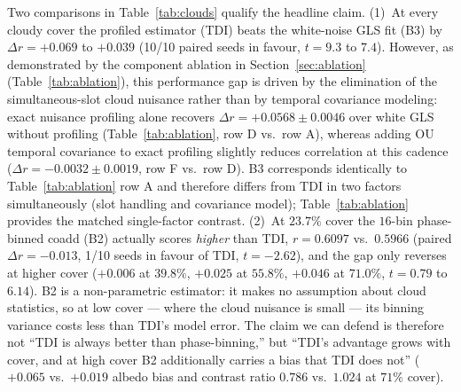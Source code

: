 \documentclass[twocolumn,10pt]{article}
\begin{document}
Two comparisons in Table~\ref{tab:clouds} qualify the headline claim.
(1)~At every cloudy cover the profiled estimator (TDI) beats the white-noise GLS
fit (B3) by $\Delta r=+0.069$ to $+0.039$ (10/10 paired seeds in favour,
$t=9.3$ to $7.4$). However, as demonstrated by the component ablation in Section~\ref{sec:ablation} (Table~\ref{tab:ablation}), this performance gap is driven by the elimination of the simultaneous-slot cloud nuisance rather than by temporal covariance modeling: exact nuisance profiling alone recovers $\Delta r = +0.0568\pm0.0046$ over white GLS without profiling (Table~\ref{tab:ablation}, row D vs.\ row A), whereas adding OU temporal covariance to exact profiling slightly reduces correlation at this cadence ($\Delta r = -0.0032\pm0.0019$, row F vs.\ row D). B3 corresponds identically to Table~\ref{tab:ablation} row A and therefore differs from TDI in two factors simultaneously (slot handling and covariance model); Table~\ref{tab:ablation} provides the matched single-factor contrast.
(2)~At $23.7\%$ cover the $16$-bin phase-binned
coadd (B2) actually scores \emph{higher} than TDI, $r=0.6097$ vs.\ $0.5966$
(paired $\Delta r=-0.013$, 1/10 seeds in favour of TDI, $t=-2.62$), and the
gap only reverses at higher cover ($+0.006$ at $39.8\%$, $+0.025$ at
$55.8\%$, $+0.046$ at $71.0\%$, $t=0.79$ to $6.14$). B2 is a
non-parametric estimator: it makes no assumption about cloud statistics, so
at low cover --- where the cloud nuisance is small --- its binning variance
costs less than TDI's model error. The claim we can defend is therefore not
``TDI is always better than phase-binning,'' but ``TDI's advantage grows
with cover, and at high cover B2 additionally carries a bias that TDI does
not'' ($+0.065$ vs.\ $+0.019$ albedo bias and contrast ratio $0.786$ vs.\
$1.024$ at $71\%$ cover).
\end{document}
